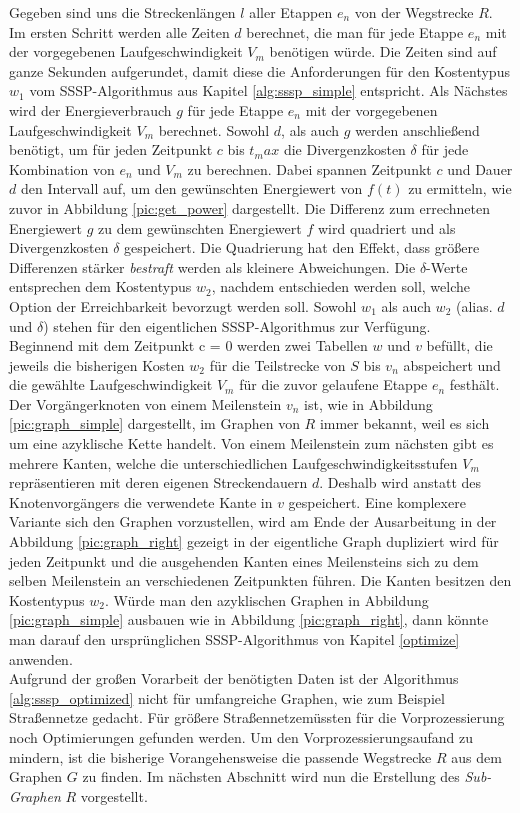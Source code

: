 \documentclass[12pt]{article}
\begin{document}
Gegeben sind uns die Streckenlängen $l$ aller Etappen $e_n$ von der Wegstrecke $R$. Im ersten Schritt werden alle Zeiten $d$ berechnet, die man für jede Etappe $e_{n}$ mit der vorgegebenen Laufgeschwindigkeit $V_m$ benötigen würde. Die Zeiten sind auf ganze Sekunden aufgerundet, damit diese die Anforderungen für den Kostentypus $w_1$ vom SSSP-Algorithmus aus Kapitel \ref{alg:sssp_simple} entspricht. Als Nächstes wird der Energieverbrauch $g$ für jede Etappe $e_{n}$ mit der vorgegebenen Laufgeschwindigkeit $V_m$ berechnet. Sowohl $d$, als auch $g$ werden anschließend benötigt, um für jeden Zeitpunkt $c$ bis $t_max$ die Divergenzkosten $\delta$ für jede Kombination von $e_n$ und $V_m$ zu berechnen. Dabei spannen Zeitpunkt $c$ und Dauer $d$ den Intervall auf, um den gewünschten Energiewert von $f(t)$ zu ermitteln, wie zuvor in Abbildung \ref{pic:get_power} dargestellt. Die Differenz zum errechneten Energiewert $g$ zu dem gewünschten Energiewert $f$ wird quadriert und als Divergenzkosten $\delta$ gespeichert. Die Quadrierung hat den Effekt, dass größere Differenzen stärker \textit{bestraft} werden als kleinere Abweichungen. Die $\delta$-Werte entsprechen dem Kostentypus $w_2$, nachdem entschieden werden soll, welche Option der Erreichbarkeit bevorzugt werden soll. Sowohl $w_1$ als auch $w_2$ (alias. $d$ und $\delta$) stehen für den eigentlichen SSSP-Algorithmus zur Verfügung. \\
Beginnend mit dem Zeitpunkt c = 0 werden zwei Tabellen $w$ und $v$ befüllt, die jeweils die bisherigen Kosten $w_2$ für die Teilstrecke von $S$ bis $v_n$ abspeichert und die gewählte Laufgeschwindigkeit $V_m$ für die zuvor gelaufene Etappe $e_n$ festhält. Der Vorgängerknoten von einem Meilenstein $v_n$ ist, wie in Abbildung \ref{pic:graph_simple} dargestellt, im Graphen von $R$ immer bekannt, weil es sich um eine azyklische Kette handelt. Von einem Meilenstein zum nächsten gibt es mehrere Kanten, welche die unterschiedlichen Laufgeschwindigkeitsstufen $V_m$ repräsentieren mit deren eigenen Streckendauern $d$. Deshalb wird anstatt des Knotenvorgängers die verwendete Kante in $v$ gespeichert. Eine komplexere Variante sich den Graphen vorzustellen, wird am Ende der Ausarbeitung in der Abbildung \ref{pic:graph_right} gezeigt in der eigentliche Graph dupliziert wird für jeden Zeitpunkt und die ausgehenden Kanten eines Meilensteins sich zu dem selben Meilenstein an verschiedenen Zeitpunkten führen. Die Kanten besitzen den Kostentypus $w_2$. Würde man den azyklischen Graphen in Abbildung \ref{pic:graph_simple} ausbauen wie in Abbildung \ref{pic:graph_right}, dann könnte man darauf den ursprünglichen SSSP-Algorithmus von Kapitel \ref{optimize} anwenden.\\ 
Aufgrund der großen Vorarbeit der benötigten Daten ist der Algorithmus \ref{alg:sssp_optimized} nicht für umfangreiche Graphen, wie zum Beispiel Straßennetze gedacht. Für größere Straßennetzemüssten für die Vorprozessierung noch Optimierungen gefunden werden. Um den Vorprozessierungsaufand zu mindern, ist die bisherige Vorangehensweise die passende Wegstrecke $R$ aus dem Graphen $G$ zu finden. Im nächsten Abschnitt wird nun die Erstellung des \textit{Sub-Graphen} $R$ vorgestellt. 
 
\end{document}
